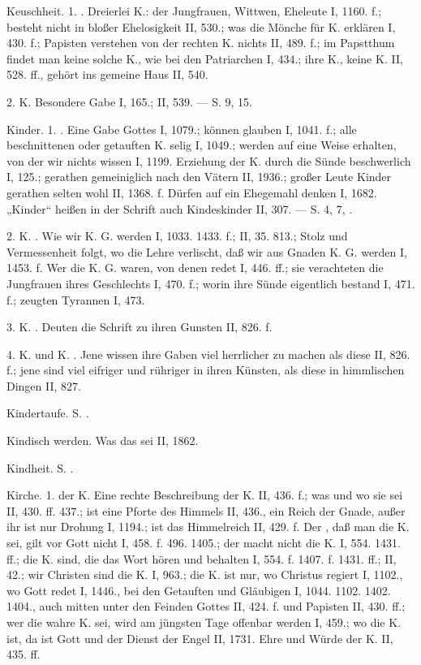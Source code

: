 Keuschheit. 1. . Dreierlei K.: der Jungfrauen, Wittwen, Eheleute I, 1160. f.; besteht nicht in bloßer Ehelosigkeit II, 530.; was die Mönche für K. erklären I, 430. f.; Papisten verstehen von der rechten K. nichts II, 489. f.; im Papstthum findet man keine solche K., wie bei den Patriarchen I, 434.; ihre K., keine K. II, 528. ff., gehört ins gemeine Haus II, 540.

2.  K. Besondere Gabe I, 165.; II, 539. — S.  9, 15.

Kinder. 1. . Eine Gabe Gottes I, 1079.; können glauben I, 1041. f.; alle beschnittenen oder getauften K. selig I, 1049.; werden auf eine Weise erhalten, von der wir nichts wissen I, 1199. Erziehung der K. durch die Sünde beschwerlich I, 125.; gerathen gemeiniglich nach den Vätern II, 1936.; großer Leute Kinder gerathen selten wohl II, 1368. f. Dürfen auf ein Ehegemahl denken I, 1682. „Kinder“ heißen in der Schrift auch Kindeskinder II, 307. — S.  4, 7, .

2. K. . Wie wir K. G. werden I, 1033. 1433. f.; II, 35. 813.; Stolz und Vermessenheit folgt, wo die Lehre verlischt, daß wir aus Gnaden K. G. werden I, 1453. f. Wer die K. G. waren, von denen  redet I, 446. ff.; sie verachteten die Jungfrauen ihres Geschlechts I, 470. f.; worin ihre Sünde eigentlich bestand I, 471. f.; zeugten Tyrannen I, 473.

3. K. . Deuten die Schrift zu ihren Gunsten II, 826. f.

4. K.  und K. . Jene wissen ihre Gaben viel herrlicher zu machen als diese II, 826. f.; jene sind viel eifriger und rühriger in ihren Künsten, als diese in himmlischen Dingen II, 827.

Kindertaufe. S. .

Kindisch werden. Was das sei II, 1862.

Kindheit. S. .

Kirche. 1.  der K. Eine rechte Beschreibung der K. II, 436. f.; was und wo sie sei II, 430. ff. 437.; ist eine Pforte des Himmels II, 436., ein Reich der Gnade, außer ihr ist nur Drohung I, 1194.; ist das Himmelreich II, 429. f. Der , daß man die K. sei, gilt vor Gott nicht I, 458. f. 496. 1405.; der  macht nicht die K. I, 554. 1431. ff.; die K. sind, die das Wort hören und behalten I, 554. f. 1407. f. 1431. ff.; II, 42.; wir Christen sind die K. I, 963.; die K. ist nur, wo Christus regiert I, 1102., wo Gott redet I, 1446., bei den Getauften und Gläubigen I, 1044. 1102. 1402. 1404., auch mitten unter den Feinden Gottes II, 424. f. und Papisten II, 430. ff.; wer die wahre K. sei, wird am jüngsten Tage offenbar werden I, 459.; wo die K. ist, da ist Gott und der Dienst der Engel II, 1731. Ehre und Würde der K. II, 435. ff.

